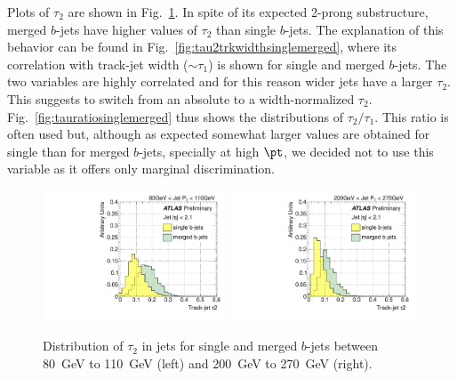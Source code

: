 Plots of $ \tau_2$ are shown in Fig.~\ref{fig:tau2singlemerged}. In spite of its expected 2-prong substructure, merged $b$-jets have higher values of $ \tau_2$ than single $b$-jets. The explanation of this behavior can be found in Fig.~\ref{fig:tau2trkwidthsinglemerged}, where its correlation with  track-jet width ($\sim \tau_1$) is shown for single and merged $b$-jets. The two variables are highly correlated and for this reason wider jets  have a larger $ \tau_2$. This suggests to switch from an absolute to a width-normalized
$\tau_2$. Fig.~\ref{fig:tauratiosinglemerged} thus shows the distributions of $\tau_2/\tau_1$. This ratio is often used but, although as expected somewhat larger values are obtained for single than for merged $b$-jets, specially at high $\pt$, we decided not to use this variable as it offers only marginal discrimination. 
\\[3mm]

\begin{figure}[tp]
\centering
\includegraphics[width=0.49\textwidth]{FIGS/VarsSingleMerged/Tau2080.pdf}
\includegraphics[width=0.49\textwidth]{FIGS/VarsSingleMerged/Tau2200.pdf}
\caption{Distribution of $\tau_2$ in jets for single and merged $b$-jets between 80~GeV to 110~GeV (left) and 200~GeV to 270~GeV (right).}
\label{fig:tau2singlemerged}
\end{figure}


